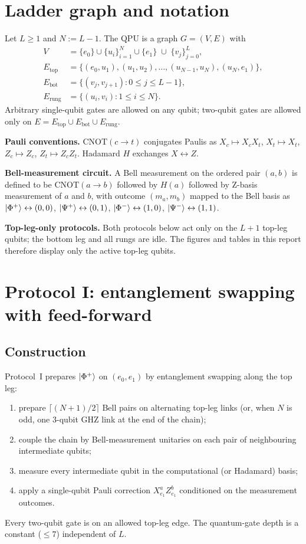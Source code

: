 \documentclass[11pt,a4paper]{article}
\theoremstyle{definition}
\newcommand{\Phip}{\ket{\Phi^+}}
\newcommand{\Phim}{\ket{\Phi^-}}
\newcommand{\Psip}{\ket{\Psi^+}}
\newcommand{\Psim}{\ket{\Psi^-}}
\newcommand{\CNOT}{\mathrm{CNOT}}
\begin{document}
\section{Ladder graph and notation}
\label{sec:setup}

Let $L\ge 1$ and $N := L-1$. The QPU is a graph $G=(V,E)$ with
\begin{align*}
  V &= \{e_0\}\cup\{u_i\}_{i=1}^{N}\cup\{e_1\}\;\cup\;\{v_j\}_{j=0}^{L},\\
  E_{\text{top}} &= \big\{(e_0,u_1),(u_1,u_2),\dots,(u_{N-1},u_N),(u_N,e_1)\big\},\\
  E_{\text{bot}} &= \big\{(v_j,v_{j+1}):0\le j\le L-1\big\},\\
  E_{\text{rung}} &= \big\{(u_i,v_i):1\le i\le N\big\}.
\end{align*}
Arbitrary single-qubit gates are allowed on any qubit; two-qubit gates
are allowed only on $E=E_{\text{top}}\cup E_{\text{bot}}\cup E_{\text{rung}}$.

\textbf{Pauli conventions.} $\CNOT(c\to t)$ conjugates Paulis as
$X_c\mapsto X_cX_t$, $X_t\mapsto X_t$, $Z_c\mapsto Z_c$,
$Z_t\mapsto Z_cZ_t$. Hadamard $H$ exchanges $X\leftrightarrow Z$.

\textbf{Bell-measurement circuit.} A Bell measurement on the ordered pair
$(a,b)$ is defined to be $\CNOT(a\to b)$ followed by $H(a)$ followed by
Z-basis measurement of $a$ and $b$, with outcome $(m_a,m_b)$ mapped to
the Bell basis as
$\Phip\leftrightarrow(0,0)$, $\Psip\leftrightarrow(0,1)$,
$\Phim\leftrightarrow(1,0)$, $\Psim\leftrightarrow(1,1)$.

\textbf{Top-leg-only protocols.} Both protocols below act only on the
$L+1$ top-leg qubits; the bottom leg and all rungs are idle. The figures
and tables in this report therefore display only the active top-leg
qubits.

\section{Protocol I: entanglement swapping with feed-forward}
\label{sec:swap}

\subsection{Construction}

Protocol~I prepares $\Phip$ on $(e_0,e_1)$ by entanglement swapping
along the top leg:
\begin{enumerate}
\item[(i)] prepare $\lceil(N+1)/2\rceil$ Bell pairs on alternating
  top-leg links (or, when $N$ is odd, one $3$-qubit GHZ link at the end
  of the chain);
\item[(ii)] couple the chain by Bell-measurement unitaries on each pair
  of neighbouring intermediate qubits;
\item[(iii)] measure every intermediate qubit in the computational (or
  Hadamard) basis;
\item[(iv)] apply a single-qubit Pauli correction $X_{e_1}^a Z_{e_1}^b$
  conditioned on the measurement outcomes.
\end{enumerate}
Every two-qubit gate is on an allowed top-leg edge. The quantum-gate
depth is a constant ($\le 7$) independent of $L$.
\end{document}
